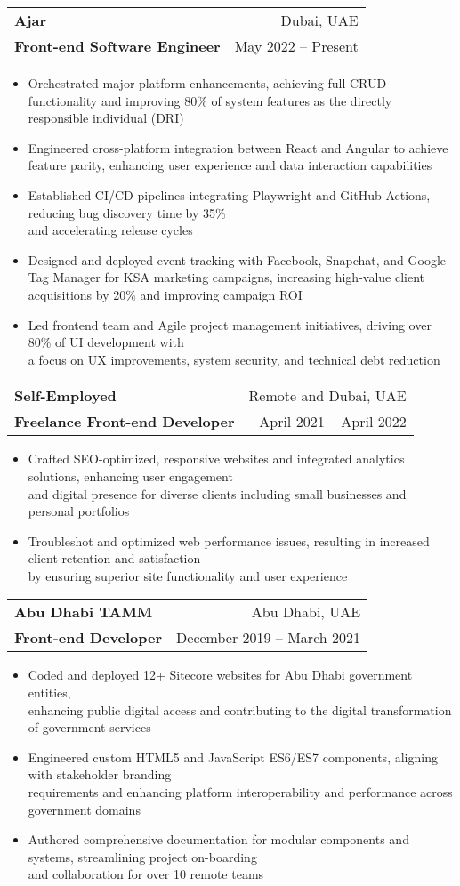 \documentclass[letterpaper,11pt]{article}
\makeatletter
\newcommand{\resumeItem}[1]{
  \item\small{
    {#1 \vspace{-2pt}}
  }
}
\newcommand{\resumeSubheading}[4]{
  \vspace{-2pt}\item
    \begin{tabular*}{0.97\textwidth}[t]{l@{\extracolsep{\fill}}r}
      \textbf{#1} & #2 \\  %
      \textbf{\small#3} & \small #4 \\  %
    \end{tabular*}\vspace{-7pt}
}
\newcommand{\resumeItemListStart}{\begin{itemize}}
\newcommand{\resumeItemListEnd}{\end{itemize}\vspace{-5pt}}
\makeatother
\begin{document}
\resumeSubheading
{Ajar}{Dubai, UAE}
{Front-end Software Engineer}{May 2022 -- Present}
\resumeItemListStart
\resumeItem{Orchestrated major platform enhancements, achieving full CRUD functionality and improving 80\% of system features as the directly responsible individual (DRI)}
\resumeItem{Engineered cross-platform integration between React and Angular to achieve feature parity, enhancing user experience and data interaction capabilities}
\resumeItem{Established CI/CD pipelines integrating Playwright and GitHub Actions, reducing bug discovery time by 35\% \\ and accelerating release cycles}
\resumeItem{Designed and deployed event tracking with Facebook, Snapchat, and Google Tag Manager for KSA marketing campaigns, increasing high-value client acquisitions by 20\% and improving campaign ROI}
\resumeItem{Led frontend team and Agile project management initiatives, driving over 80\% of UI development with \\ a focus on UX improvements, system security, and technical debt reduction}
\resumeItemListEnd


\resumeSubheading
{Self-Employed}{Remote and Dubai, UAE}
{Freelance Front-end Developer}{April 2021 -- April 2022}
\resumeItemListStart
\resumeItem{Crafted SEO-optimized, responsive websites and integrated analytics solutions, enhancing user engagement \\ and digital presence for diverse clients including small businesses and personal portfolios}
\resumeItem{Troubleshot and optimized web performance issues, resulting in increased client retention and satisfaction \\ by ensuring superior site functionality and user experience}
\resumeItemListEnd


\resumeSubheading
{Abu Dhabi TAMM}{Abu Dhabi, UAE}
{Front-end Developer}{December 2019 -- March 2021}
\resumeItemListStart
\resumeItem{Coded and deployed 12+ Sitecore websites for Abu Dhabi government entities, \\ enhancing public digital access and contributing to the digital transformation of government services}
\resumeItem{Engineered custom HTML5 and JavaScript ES6/ES7 components, aligning with stakeholder branding \\ requirements and enhancing platform interoperability and performance across government domains}
\resumeItem{Authored comprehensive documentation for modular components and systems, streamlining project on-boarding \\ and collaboration for over 10 remote teams}
\resumeItemListEnd
\end{document}
